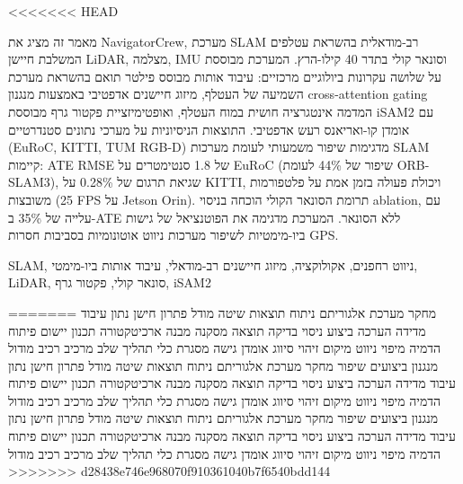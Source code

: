 <<<<<<< HEAD



מאמר זה מציג את NavigatorCrew, מערכת SLAM רב-מודאלית בהשראת עטלפים המשלבת חיישן LiDAR, מצלמה, IMU וסונאר קולי בתדר 40 קילו-הרץ. המערכת מבוססת על שלושה עקרונות ביולוגיים מרכזיים: עיבוד אותות מבוסס פילטר תואם בהשראת מערכת השמיעה של העטלף, מיזוג חיישנים אדפטיבי באמצעות מנגנון cross-attention gating המדמה אינטגרציה חושית במוח העטלף, ואופטימיזציית פקטור גרף מבוססת iSAM2 עם אומדן קו-ואריאנס רעש אדפטיבי. התוצאות הניסיוניות על מערכי נתונים סטנדרטיים (EuRoC, KITTI, TUM RGB-D) מדגימות שיפור משמעותי לעומת מערכות SLAM קיימות: ATE RMSE של 1.8 סנטימטרים על EuRoC (שיפור של 44\% לעומת ORB-SLAM3), שגיאת תרגום של 0.28\% על KITTI, ויכולת פעולה בזמן אמת על פלטפורמות משובצות (25 FPS על Jetson Orin). תרומת הסונאר הקולי הוכחה בניסוי ablation, עם עלייה של 35\% ב-ATE ללא הסונאר. המערכת מדגימה את הפוטנציאל של גישות ביו-מימטיות לשיפור מערכות ניווט אוטונומיות בסביבות חסרות GPS.


\begin{IEEEkeywords}
SLAM, ניווט רחפנים, אקולוקציה, מיזוג חיישנים רב-מודאלי, עיבוד אותות ביו-מימטי, LiDAR, סונאר קולי, פקטור גרף, iSAM2
\end{IEEEkeywords}
=======
מחקר מערכת אלגוריתם ניתוח תוצאות שיטה מודל פתרון חישן נתון עיבוד מדידה הערכה ביצוע ניסוי בדיקה תוצאה מסקנה מבנה ארכיטקטורה תכנון יישום פיתוח הדמיה מיפוי ניווט מיקום זיהוי סיווג אומדן גישה מסגרת כלי תהליך שלב מרכיב רכיב מודול מנגנון ביצועים שיפור מחקר מערכת אלגוריתם ניתוח תוצאות שיטה מודל פתרון חישן נתון עיבוד מדידה הערכה ביצוע ניסוי בדיקה תוצאה מסקנה מבנה ארכיטקטורה תכנון יישום פיתוח הדמיה מיפוי ניווט מיקום זיהוי סיווג אומדן גישה מסגרת כלי תהליך שלב מרכיב רכיב מודול מנגנון ביצועים שיפור מחקר מערכת אלגוריתם ניתוח תוצאות שיטה מודל פתרון חישן נתון עיבוד מדידה הערכה ביצוע ניסוי בדיקה תוצאה מסקנה מבנה ארכיטקטורה תכנון יישום פיתוח הדמיה מיפוי ניווט מיקום זיהוי סיווג אומדן גישה מסגרת כלי תהליך שלב מרכיב רכיב מודול
>>>>>>> d28438e746e968070f910361040b7f6540bdd144

